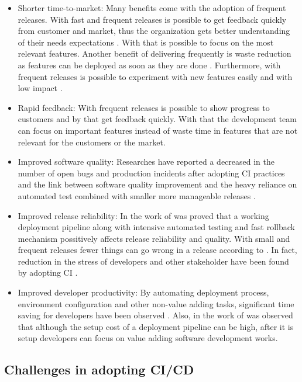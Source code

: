 \begin{itemize}
\item Shorter time-to-market: Many benefits come with the adoption of frequent releases. With fast and frequent releases is possible to get feedback quickly from customer and market, thus the organization gets better understanding of their needs expectations \citep{Neely2013}. With that is possible to focus on the most relevant features. Another benefit of delivering frequently is waste reduction as features can be deployed as soon as they are done \citep{Leppanen2015}. Furthermore, with frequent releases is possible to experiment with new features easily and with low impact \citep{Neely2013}.
\item Rapid feedback: With frequent releases is possible to show progress to customers and by that get feedback quickly. With that the development team can focus on important features instead of waste time in features that are not relevant for the customers or the market.
\item Improved software quality: Researches have reported a decreased in the number of open bugs and production incidents after adopting CI practices \citep{Mantyla2015} and the link between software quality improvement and the heavy reliance on automated test combined with smaller more manageable releases \citep{Leppanen2015}.
\item Improved release reliability: In the work of \cite{Neely2013} was proved that a working deployment pipeline along with intensive automated testing and fast rollback mechanism possitively affects release reliability and quality. With small and frequent releases fewer things can go wrong in a release according to \cite{Fowler2013}. In fact, reduction in the stress of developers and other stakeholder have been found by adopting CI \citep{Neely2013} \citep{Chen2015}.
\item Improved developer productivity: By automating deployment process, environment configuration and other non-value adding tasks, significant time saving for developers have been observed \citep{Rodriguez2016}. Also, in the work of \cite{Humble2010} was observed that although the setup cost of a deployment pipeline can be high, after it is setup developers can focus on value adding software development works.
\end{itemize}

\subsection{Challenges in adopting CI/CD}
\label{ci-challenges}

